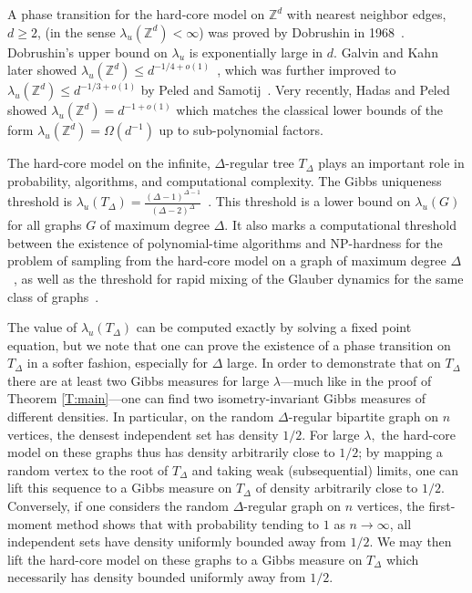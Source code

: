 \documentclass[11pt]{amsart}
\theoremstyle{definition}
\theoremstyle{remark}
\newcommand{\Z}{\mathbb{Z}}
\newcommand{\lam}{\lambda}
\begin{document}
A phase transition for the hard-core model on $\Z^d$ with nearest neighbor edges, $d \ge 2$, (in the sense $\lam_u(\Z^d) < \infty$)  was proved by Dobrushin in 1968~\cite{dobrushin1968problem}. Dobrushin's upper bound on $\lam_u$ is exponentially large in $d$.  Galvin and Kahn later showed $\lambda_u(\Z^d) \leq d^{-1/4 + o(1)}$~\cite{galvin2004phase}, which was further improved to  $\lambda_u(\Z^d) \leq  d^{-1/3 + o(1)}$ by Peled and Samotij~\cite{peled2014odd}.  Very recently, Hadas and Peled \cite{hadas2026critical} showed $\lambda_u(\Z^d) = d^{-1 + o(1)}$ which matches the classical lower bounds of the form $\lam_u(\Z^d) = \Omega(d^{-1})$ up to sub-polynomial factors.



The hard-core model on the infinite, $\Delta$-regular tree $T_\Delta$ plays an important role in probability, algorithms, and computational complexity.  The Gibbs uniqueness threshold is $\lam_u(T_{\Delta}) = \frac{(\Delta-1)^{\Delta-1}}{(\Delta-2)^\Delta}$~\cite{spitzer1975markov,kelly1985stochastic}.  This threshold is a lower bound on $\lam_u(G)$ for all graphs  $G$ of maximum degree $\Delta$.  It also marks a computational threshold between the existence of polynomial-time algorithms and NP-hardness for the problem of sampling from the hard-core model on a graph of maximum degree $\Delta$~\cite{Weitz,sly2010computational}, as well as the threshold for rapid mixing of the Glauber dynamics for the same class of graphs~\cite{mossel2009hardness,anari2021spectral}.  


The value of $\lam_u(T_\Delta)$ can be computed exactly by solving a fixed point equation, but we note that one can prove the existence of a phase transition on $T_\Delta$ in a softer fashion, especially for $\Delta$ large.  In order to demonstrate that on $T_\Delta$ there are at least two Gibbs measures for large $\lambda$---much like in the proof of Theorem \ref{T:main}---one can find two isometry-invariant Gibbs measures of different densities.  In particular, on the random $\Delta$-regular bipartite graph on $n$ vertices, the densest independent set has density $1/2 $.  For large $\lambda,$ the hard-core model on these graphs thus has density arbitrarily close to $1/2$; by mapping a random vertex to the root of $T_\Delta$ and taking weak (subsequential) limits,  one can lift this sequence  to a Gibbs measure on $T_\Delta$ of density arbitrarily close to $1/2$.  Conversely, if one considers the random $\Delta$-regular graph on $n$ vertices, the first-moment method shows that {with probability tending to $1$ as $n \to \infty$}, all independent sets have density uniformly bounded away from $1/2$.  We may then lift the hard-core model on these graphs to a Gibbs measure on $T_\Delta$ which necessarily has density bounded uniformly away from $1/2$.  
\end{document}
